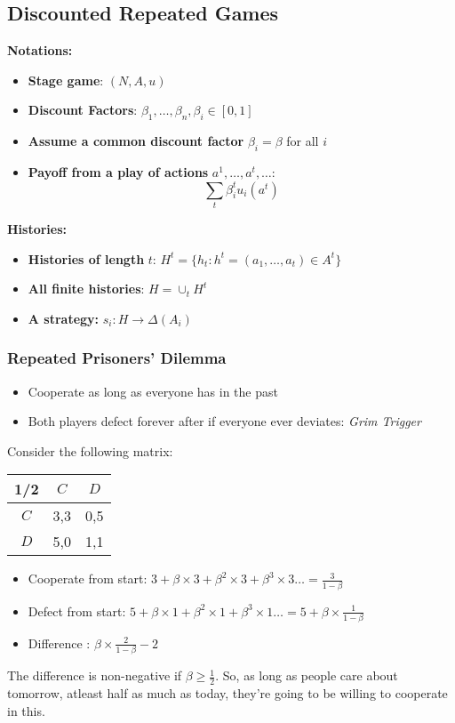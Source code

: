 \subsection{Discounted Repeated Games}
\textbf{Notations:}
\begin{itemize}
\item \textbf{Stage game}: $(N, A, u)$
\item \textbf{Discount Factors}: $\beta_1, \dots, \beta_n, \beta_i \in [0,1]$
\item \textbf{Assume a common discount factor} $\beta_i = \beta$ for all $i$
\item \textbf{Payoff from a play of actions} $a^1, \dots , a^t, \dots:$ $$\sum_t \beta_i^t u_i(a^t)$$
\end{itemize}
\textbf{Histories:}
\begin{itemize}
\item \textbf{Histories of length }$t$: $H^t = \{h_t : h^t = (a_1, \dots, a_t) \in A^t\}$
\item \textbf{All finite histories}: $H = \cup_t H^t$
\item \textbf{A strategy:} $s_i: H \to \Delta(A_i)$ 
\end{itemize}

\subsubsection{Repeated Prisoners' Dilemma}
\begin{itemize}
\item Cooperate as long as everyone has in the past
\item Both players defect forever after if everyone ever deviates: \textit{Grim Trigger}
\end{itemize}
Consider the following matrix:
\begin{center}\begin{tabular}{|c|c|c|} \hline
1/2 & $C$ & $D$ \\ \hline
$C$ & 3,3 & 0,5 \\ \hline
$D$ & 5,0 & 1,1 \\ \hline 
\end{tabular}\end{center}
\begin{itemize}
\item Cooperate from start: $3 + \beta \times 3 + \beta^2 \times 3 + \beta^3 \times 3 \dots = \frac{3}{1-\beta}$
\item Defect from start: $5 + \beta \times 1 + \beta^2 \times 1 + \beta^3 \times 1 \dots = 5 + \beta \times \frac{1}{1-\beta}$
\item Difference : $\beta \times \frac{2}{1-\beta} - 2$
\end{itemize}
The difference is non-negative if $\beta \geq \frac{1}{2}$. So, as long as people care about tomorrow, atleast half as much as today, they're going to be willing to cooperate in this.

